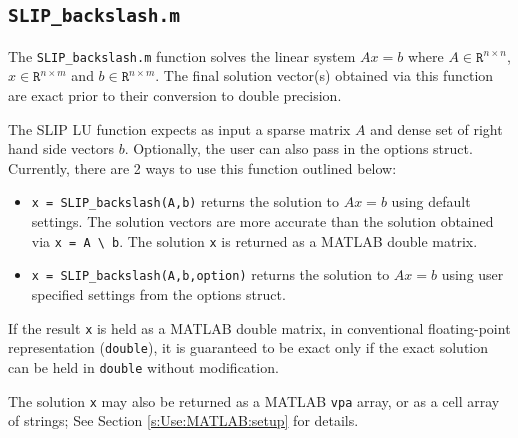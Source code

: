 \documentclass[12pt]{article}
\theoremstyle{definition}
\begin{document}
\cprotect\subsection{\verb|SLIP_backslash.m|}
\label{s:Use:MATLAB:factor}

The \verb|SLIP_backslash.m| function solves the linear system $A x = b$ where
$A \in \mathtt{R}^{n \times n}$, $x \in \mathtt{R}^{n \times m}$ and $b \in
\mathtt{R}^{n \times m}$. The final solution vector(s) obtained via this
function are exact prior to their conversion to double precision.

The SLIP LU function expects as input a sparse matrix $A$ and dense set of
right hand side vectors $b$. Optionally, the user can also pass in the options
struct. Currently, there are 2 ways to use this function outlined below:

\begin{itemize}

\item \verb|x = SLIP_backslash(A,b)| returns the solution to $A x =
b$ using default settings. The solution vectors are more accurate than
the solution obtained via \verb|x = A \ b|.  The solution \verb|x| is
returned as a MATLAB double matrix.

\item \verb|x = SLIP_backslash(A,b,option)| returns the solution to $A x =
b$ using user specified settings from the options struct.

\end{itemize}

If the result \verb|x| is held as a MATLAB double matrix, in conventional
floating-point representation (\verb|double|), it is guaranteed to be exact
only if the exact solution can be held in \verb|double| without modification.

The solution \verb|x| may also be returned as a MATLAB \verb|vpa| array, or as
a cell array of strings; See Section \ref{s:Use:MATLAB:setup} for details.


\newpage


\end{document}
